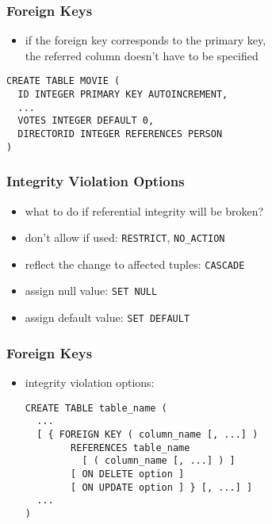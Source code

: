 \documentclass[dvipsnames]{beamer}
\theoremstyle{plain}
\begin{document}
\begin{frame}[fragile]
  \frametitle{Foreign Keys}

  \begin{itemize}
    \item if the foreign key corresponds to the primary key,\\
      the referred column doesn't have to be specified
  \end{itemize}

  \begin{example}
    \begin{lstlisting}
CREATE TABLE MOVIE (
  ID INTEGER PRIMARY KEY AUTOINCREMENT,
  ...
  VOTES INTEGER DEFAULT 0,
  DIRECTORID INTEGER REFERENCES PERSON
)
    \end{lstlisting}
  \end{example}
\end{frame}

\begin{frame}
  \frametitle{Integrity Violation Options}

  \begin{itemize}
    \item what to do if referential integrity will be broken?

    \medskip
    \item don't allow if used: \texttt{RESTRICT}, \texttt{NO\_ACTION}
    \item reflect the change to affected tuples: \texttt{CASCADE}
    \item assign null value: \texttt{SET NULL}
    \item assign default value: \texttt{SET DEFAULT}
  \end{itemize}
\end{frame}

\begin{frame}[fragile]
  \frametitle{Foreign Keys}

  \begin{itemize}
    \item integrity violation options:
    \begin{lstlisting}
CREATE TABLE table_name (
  ...
  [ { FOREIGN KEY ( column_name [, ...] )
        REFERENCES table_name
          [ ( column_name [, ...] ) ]
        [ ON DELETE option ]
        [ ON UPDATE option ] } [, ...] ]
  ...
)
    \end{lstlisting}
  \end{itemize}
\end{frame}
\end{document}
